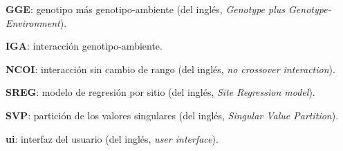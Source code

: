 \begin{description}
\item{\textbf{GGE}}: genotipo más genotipo-ambiente (del inglés, \emph{Genotype plus Genotype-Environment}).

\item{\textbf{IGA}}: interacción genotipo-ambiente.

\item{\textbf{NCOI}}: interacción sin cambio de rango (del inglés, \emph{no crossover interaction}).

\item{\textbf{SREG}}: modelo de regresión por sitio (del inglés, \emph{Site Regression model}).

\item{\textbf{SVP}}: partición de los valores singulares (del inglés, \emph{Singular Value Partition}).

\item{\textbf{ui}}: interfaz del usuario (del inglés, \emph{user interface}).


\end{description}

